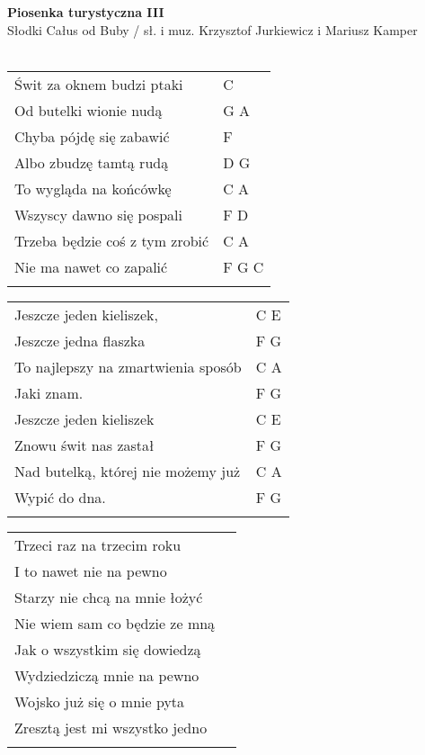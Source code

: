 \documentclass[a5paper]{article}
\begin{document}


\noindent
\fontsize{12pt}{15pt}\selectfont
\textbf{Piosenka turystyczna III} \\
\fontsize{8pt}{10pt}\selectfont
Słodki Całus od Buby / sł. i muz. Krzysztof Jurkiewicz i Mariusz Kamper \\ \\
\fontsize{10pt}{12pt}\selectfont
{}
\begin{tabular}{@{}p{8.00cm}p{3cm}@{}}
\noindent
Świt za oknem budzi ptaki & C \\
Od butelki wionie nudą & G A \\
Chyba pójdę się zabawić & F \\
Albo zbudzę tamtą rudą & D G \\
To wygląda na końcówkę & C A \\
Wszyscy dawno się pospali & F D \\
Trzeba będzie coś z tym zrobić & C A \\
Nie ma nawet co zapalić & F G C \\ \\
\end{tabular}

\noindent
\begin{tabular}{@{}p{7.00cm}p{3cm}@{}}
Jeszcze jeden kieliszek, & C E \\
Jeszcze jedna flaszka & F G \\
To najlepszy na zmartwienia sposób & C A \\
Jaki znam. & F G \\
Jeszcze jeden kieliszek & C E \\
Znowu świt nas zastał & F G \\
Nad butelką, której nie możemy już & C A \\
Wypić do dna. & F G \\ \\
\end{tabular}

\noindent
\begin{tabular}{@{}p{7.00cm}p{3cm}@{}}
Trzeci raz na trzecim roku \\
I to nawet nie na pewno \\
Starzy nie chcą na mnie łożyć\\
Nie wiem sam co będzie ze mną\\
Jak o wszystkim się dowiedzą\\
Wydziedziczą mnie na pewno\\
Wojsko już się o mnie pyta\\
Zresztą jest mi wszystko jedno\\ \\
\end{tabular}
\end{document}
